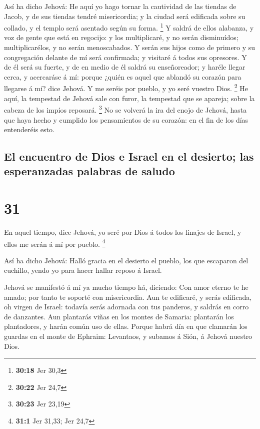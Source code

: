  Así ha dicho Jehová: He aquí yo hago tornar la
cautividad de las tiendas de Jacob, y de sus tiendas tendré
misericordia; y la ciudad será edificada sobre su collado, y el templo
será asentado según su forma. \footnote{\textbf{30:18} Jer 30,3}
 Y saldrá de ellos alabanza, y voz de gente que está en
regocijo: y los multiplicaré, y no serán disminuídos; multiplicarélos, y
no serán menoscabados.  Y serán sus hijos como de primero
y su congregación delante de mí será confirmada; y visitaré á todos sus
opresores.  Y de él será su fuerte, y de en medio de él
saldrá su enseñoreador; y haréle llegar cerca, y acercaráse á mí: porque
¿quién es aquel que ablandó su corazón para llegarse á mí? dice Jehová.
 Y me seréis por pueblo, y yo seré vuestro Dios.
\footnote{\textbf{30:22} Jer 24,7}  He aquí, la tempestad
de Jehová sale con furor, la tempestad que se apareja; sobre la cabeza
de los impíos reposará. \footnote{\textbf{30:23} Jer 23,19}
 No se volverá la ira del enojo de Jehová, hasta que haya
hecho y cumplido los pensamientos de su corazón: en el fin de los días
entenderéis esto.

\hypertarget{el-encuentro-de-dios-e-israel-en-el-desierto-las-esperanzadas-palabras-de-saludo}{%
\subsection{El encuentro de Dios e Israel en el desierto; las
esperanzadas palabras de
saludo}\label{el-encuentro-de-dios-e-israel-en-el-desierto-las-esperanzadas-palabras-de-saludo}}

\hypertarget{section-30}{%
\section{31}\label{section-30}}

 En aquel tiempo, dice Jehová, yo seré por Dios á todos
los linajes de Israel, y ellos me serán á mí por pueblo. \footnote{\textbf{31:1}
  Jer 31,33; Jer 24,7}

 Así ha dicho Jehová: Halló gracia en el desierto el
pueblo, los que escaparon del cuchillo, yendo yo para hacer hallar
reposo á Israel.

 Jehová se manifestó á mí ya mucho tiempo há, diciendo:
Con amor eterno te he amado; por tanto te soporté con misericordia.
 Aun te edificaré, y serás edificada, oh virgen de Israel:
todavía serás adornada con tus panderos, y saldrás en corro de
danzantes.  Aun plantarás viñas en los montes de Samaria:
plantarán los plantadores, y harán común uso de ellas. 
Porque habrá día en que clamarán los guardas en el monte de Ephraim:
Levantaos, y subamos á Sión, á Jehová nuestro Dios.

